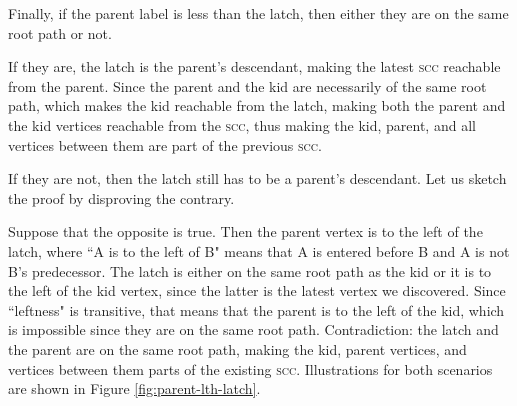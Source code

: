 \documentclass[twoside]{article}
\begin{document}
Finally, if the parent label is less than the latch, then either they are on the same root path or not.

If they are, the latch is the parent's descendant, making the
latest \textsc{scc} reachable from the parent.  Since the parent and the kid are necessarily of the same root path, which makes the kid reachable from the latch, making both the parent and the kid vertices reachable from the \textsc{scc}, thus making the kid, parent, and all vertices between them are part of the previous \textsc{scc}.

\sloppy
If they are not, then the latch still has to be a parent's \mbox{descendant}.  Let us sketch the proof by disproving the contrary.

Suppose that the opposite is true. Then the parent vertex is to the left of the latch, where ``A is to the left of B" means that A is entered before B and A is not B's predecessor.  The latch is either on the same root path as the kid or it is to the left of the kid vertex, since the latter is the latest vertex we discovered.  Since ``leftness" is transitive, that means that the parent is to the left of the kid, which is impossible since they are on the same root path.  Contradiction: the latch and
the parent are on the same root path, making the kid, parent vertices, and vertices between them parts of the existing \textsc{scc}.  Illustrations for both scenarios are shown in Figure \ref{fig:parent-lth-latch}.
\end{document}
